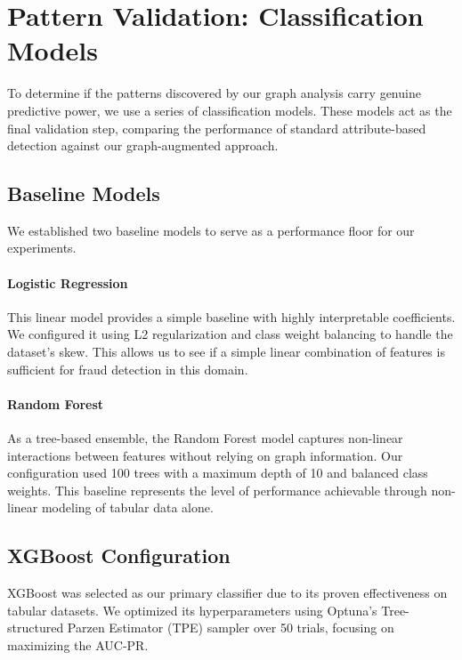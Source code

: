 \section{Pattern Validation: Classification Models}
\label{sec:3_8}

To determine if the patterns discovered by our graph analysis carry genuine predictive power, we use a series of classification models. These models act as the final validation step, comparing the performance of standard attribute-based detection against our graph-augmented approach.

\subsection{Baseline Models}

We established two baseline models to serve as a performance floor for our experiments.

\paragraph{Logistic Regression}
This linear model provides a simple baseline with highly interpretable coefficients. We configured it using L2 regularization and class weight balancing to handle the dataset's skew. This allows us to see if a simple linear combination of features is sufficient for fraud detection in this domain.

\paragraph{Random Forest}
As a tree-based ensemble, the Random Forest model captures non-linear interactions between features without relying on graph information. Our configuration used 100 trees with a maximum depth of 10 and balanced class weights. This baseline represents the level of performance achievable through non-linear modeling of tabular data alone.

\subsection{XGBoost Configuration}

XGBoost was selected as our primary classifier due to its proven effectiveness on tabular datasets. We optimized its hyperparameters using Optuna's Tree-structured Parzen Estimator (TPE) sampler over 50 trials, focusing on maximizing the AUC-PR.

